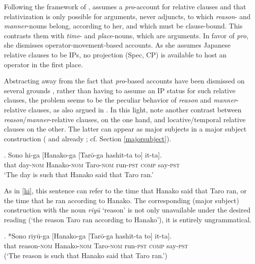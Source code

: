 Following the framework of \citet{lasnik:1992:move}, \citet[§ 3.4]{murasugi:1991:noun} assumes a \textit{pro}-account for relative clauses and that relativization is only possible for arguments, never adjuncts, to which \textit{reason}- and \textit{manner}-nouns belong, according to her, and which must be clause-bound. This contrasts them with \textit{time}- and \textit{place}-nouns, which are arguments. In favor of \textit{pro}, she dismisses operator-movement-based accounts. As she assumes Japanese relative clauses to be IPs, no projection (Spec, CP) is available to host an operator in the first place.

Abstracting away from the fact that \textit{pro}-based accounts have been dismissed on several grounds \citep[36–37]{salzmann:2017:reconstruction}, rather than having to assume an IP status for such relative clauses, the problem seems to be the peculiar behavior of \textit{reason} and \textit{manner}-relative clauses, as also argued in \citet{miyamoto:2017:RC}. In this light, note another contrast between \textit{reason}/\textit{manner}-relative clauses, on the one hand, and locative/temporal relative clauses on the other. The latter can appear as major subjects in a major subject construction (\citealt{kuroda:1992:japanese} and already \citealt{kuno:1973:structure}; cf. Section \ref{majorsubject}). 

\exg. Sono hi-ga [Hanako-ga [Tarō-ga hashit-ta to] it-ta].\\
that day-\textsc{nom} Hanako-\textsc{nom} Taro-\textsc{nom} run-\textsc{pst} \textsc{comp} say-\textsc{pst}\\
`The day is such that Hanako said that Taro ran.' \\ \null \hfill \citep[628]{miyamoto:2017:RC} \label{sono hi}

\newpage

As in \ref{hi}, this sentence can refer to the time that Hanako said that Taro ran, or the time that he ran according to Hanako. The corresponding (major subject) construction with the noun \textit{riyū} `reason' is not only unavailable under the desired reading (`the reason Taro ran according to Hanako’), it is entirely ungrammatical.

\exg. *Sono riyū-ga [Hanako-ga [Tarō-ga hashit-ta to] it-ta].\\
that reason-\textsc{nom} Hanako-\textsc{nom} Taro-\textsc{nom} run-\textsc{pst} \textsc{comp} say-\textsc{pst}\\
(`The reason is such that Hanako said that Taro ran.’) \\ \null \hfill \citep[628]{miyamoto:2017:RC}

